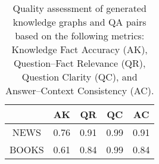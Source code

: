 \begin{table}[t]
    \centering
    \small 
    \caption{Quality assessment of generated knowledge graphs and QA pairs based on the following metrics: Knowledge Fact Accuracy (AK), Question–Fact Relevance (QR), Question Clarity (QC), and Answer–Context Consistency (AC).}
    \label{tab:quality_qa}
    \begin{tabular}{ccccc}
    \hline
          & AK  & QR   & QC   & AC   \\ \hline
    NEWS  & 0.76 & 0.91 & 0.99 & 0.91 \\
    BOOKS & 0.61 & 0.84 & 0.99 & 0.84 \\ \hline
    \end{tabular}
    \end{table}